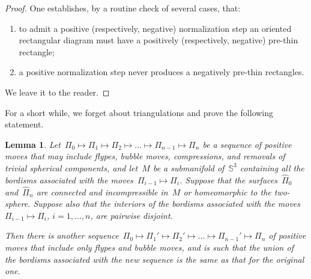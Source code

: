 \documentclass{amsart}
\theoremstyle{theorem}
\newtheorem{lemm}[theo]{Lemma}
\theoremstyle{remark}
\theoremstyle{definition}
\numberwithin{equation}{section}
\numberwithin{figure}{section}
\begin{document}
\begin{proof}
One establishes, by a routine check of several cases, that:\begin{enumerate}
\item
to admit a positive (respectively, negative) normalization step an oriented rectangular diagram must
have a positively (respectively, negative) pre-thin rectangle;
\item
 a positive normalization step never
produces a negatively pre-thin rectangles.
\end{enumerate}
We leave it to the reader.
\end{proof}

For a short while, we forget about triangulations and prove the following statement.

\begin{lemm}\label{no-compres-lem}
Let~$\Pi_0\mapsto\Pi_1\mapsto\Pi_2\mapsto\ldots\mapsto\Pi_{n-1}\mapsto\Pi_n$ be a sequence of
positive moves that may include flypes, bubble moves, compressions, and removals of
trivial spherical components, and let~$M$ be a submanifold of~$\mathbb S^3$ containing
all the bordisms associated with the moves~$\Pi_{i-1}\mapsto\Pi_i$. Suppose that the surfaces~$\widehat\Pi_0$ and~$\widehat\Pi_n$
are connected and incompressible in~$M$ or homeomorphic to the two-sphere.
Suppose also that the interiors of the bordisms associated with the moves~$\Pi_{i-1}\mapsto\Pi_i$, $i=1,\ldots,n$,
are pairwise disjoint.

Then there is another sequence~$\Pi_0\mapsto\Pi_1'\mapsto\Pi_2'\mapsto\ldots\mapsto\Pi_{n-1}'\mapsto\Pi_n$
of positive moves that include only flypes and bubble moves, and is such that
the union of the bordisms associated with the new sequence is the same
as that for the original one.
\end{lemm}
\end{document}
